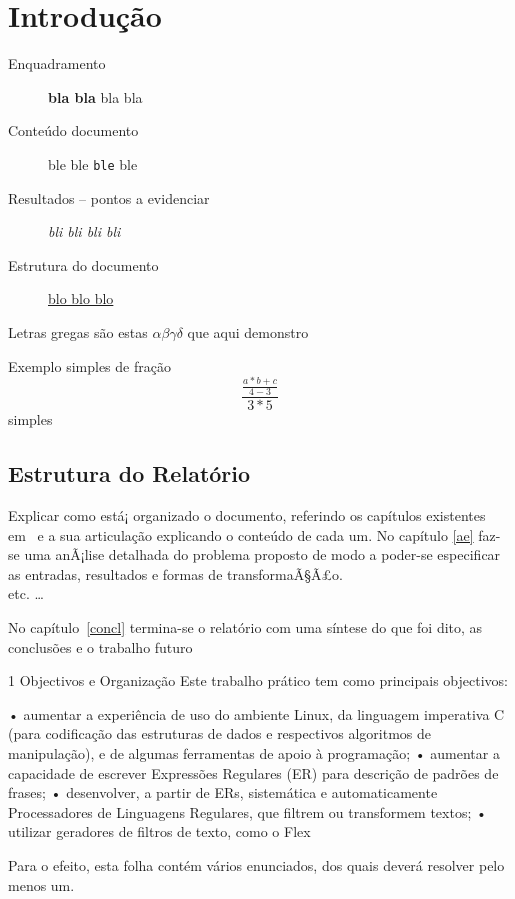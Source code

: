 \chapter*{Introdução} \label{intro}

\begin{description}
  \item [Enquadramento] \textbf{bla bla} bla bla
  \item [Conteúdo documento] \textsf{ble ble} \texttt{ble} ble
  \item [Resultados -- pontos a evidenciar] \textit{bli bli bli bli}
  \item [Estrutura do documento] \underline{blo blo blo}
\end{description}

Letras gregas são estas $ \alpha \beta \gamma \delta $ que aqui demonstro

Exemplo simples de fração \[ \frac{\frac{a * b + c}{4-3}}{3*5} \] simples

\section*{Estrutura do Relatório} 


Explicar como está¡ organizado o documento, referindo os capítulos existentes
em~\cite{yu09} e a sua articulação explicando o conteúdo de cada um.  No
capítulo \ref{ae} faz-se uma anÃ¡lise detalhada do problema proposto de modo
a poder-se especificar  as entradas, resultados e formas de transformaÃ§Ã£o.\\
etc. \ldots


No capítulo~\ref{concl} termina-se o relatório com uma síntese do que foi dito,
as conclusões e o trabalho futuro

1     Objectivos e Organização
Este trabalho prático tem como principais objectivos:

    • aumentar a experiência de uso do ambiente Linux, da linguagem imperativa C (para codificação das estruturas
      de dados e respectivos algoritmos de manipulação), e de algumas ferramentas de apoio à programação;
    • aumentar a capacidade de escrever Expressões Regulares (ER) para descrição de padrões de frases;
    • desenvolver, a partir de ERs, sistemática e automaticamente Processadores de Linguagens Regulares, que filtrem
      ou transformem textos;
    • utilizar geradores de filtros de texto, como o Flex

Para o efeito, esta folha contém vários enunciados, dos quais deverá resolver pelo menos um.

